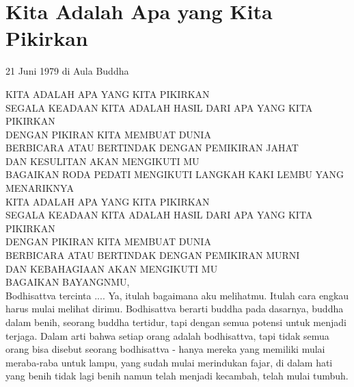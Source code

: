 \chapter{Kita Adalah Apa yang Kita Pikirkan}

21 Juni 1979 di Aula Buddha

KITA ADALAH APA YANG KITA PIKIRKAN \\
SEGALA KEADAAN KITA ADALAH HASIL DARI APA YANG KITA PIKIRKAN \\
DENGAN PIKIRAN KITA MEMBUAT DUNIA \\
BERBICARA ATAU BERTINDAK DENGAN PEMIKIRAN JAHAT \\
DAN KESULITAN AKAN MENGIKUTI MU \\
BAGAIKAN RODA PEDATI MENGIKUTI LANGKAH KAKI LEMBU YANG MENARIKNYA \\

KITA ADALAH APA YANG KITA PIKIRKAN \\
SEGALA KEADAAN KITA ADALAH HASIL DARI APA YANG KITA PIKIRKAN \\
DENGAN PIKIRAN KITA MEMBUAT DUNIA \\
BERBICARA ATAU BERTINDAK DENGAN PEMIKIRAN MURNI \\
DAN KEBAHAGIAAN AKAN MENGIKUTI MU \\
BAGAIKAN BAYANGNMU,\\


Bodhisattva tercinta .... Ya, itulah bagaimana aku melihatmu.
Itulah cara engkau harus mulai melihat dirimu.
Bodhisattva berarti buddha pada dasarnya,
buddha dalam benih, seorang buddha tertidur,
tapi dengan semua potensi untuk menjadi terjaga.
Dalam arti bahwa setiap orang adalah bodhisattva,
tapi tidak semua orang bisa disebut seorang bodhisattva -
hanya mereka yang memiliki mulai meraba-raba untuk lampu,
yang sudah mulai merindukan fajar,
di dalam hati yang benih tidak lagi benih namun telah menjadi kecambah,
telah mulai tumbuh.





